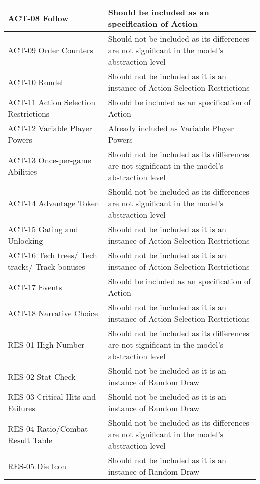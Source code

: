 \begin{longtable}{|m{7cm}|m{7cm}|}
        \hline
        ACT-08 Follow & Should be included as an specification of Action \\
        \hline
        ACT-09 Order Counters & Should not be included as its differences are not significant in the model's abstraction level \\
        \hline
        ACT-10 Rondel & Should not be included as it is an instance of Action Selection Restrictions \\
        \hline
        ACT-11 Action Selection Restrictions & Should be included as an specification of Action \\
        \hline
        ACT-12 Variable Player Powers & Already included as Variable Player Powers \\
        \hline
        ACT-13 Once-per-game Abilities & Should not be included as its differences are not significant in the model's abstraction level \\
        \hline
        ACT-14 Advantage Token & Should not be included as its differences are not significant in the model's abstraction level \\
        \hline
        ACT-15 Gating and Unlocking & Should not be included as it is an instance of Action Selection Restrictions \\
        \hline
        ACT-16 Tech trees/ Tech tracks/ Track bonuses & Should not be included as it is an instance of Action Selection Restrictions \\
        \hline
        ACT-17 Events & Should be included as an specification of Action \\
        \hline
        ACT-18 Narrative Choice & Should not be included as it is an instance of Action Selection Restrictions \\
        \hline
        RES-01 High Number & Should not be included as its differences are not significant in the model's abstraction level \\
        \hline
        RES-02 Stat Check & Should not be included as it is an instance of Random Draw \\
        \hline
        RES-03 Critical Hits and Failures & Should not be included as it is an instance of Random Draw \\
        \hline
        RES-04 Ratio/Combat Result Table & Should not be included as its differences are not significant in the model's abstraction level \\
        \hline
        RES-05 Die Icon & Should not be included as it is an instance of Random Draw \\

\end{longtable}
